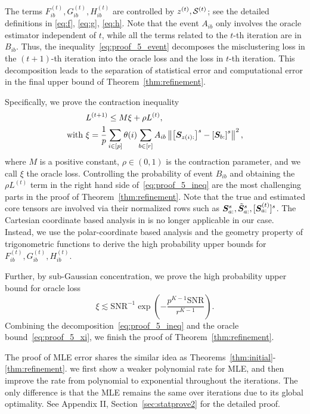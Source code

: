 \documentclass[journal]{IEEEtran}
\theoremstyle{definition}
\theoremstyle{definition}
\newcommand{\of}[1]{\left(#1\right)}
\newcommand{\off}[1]{\left[#1\right]}
\begin{document}
\normalsize
The terms $F_{ib}^{(t)}, G_{ib}^{(t)}, H_{ib}^{(t)}$ are controlled by $z^{(t)}, \mathcal{S}^{(t)}$; see the detailed definitions in \eqref{eq:f}, \eqref{eq:g}, \eqref{eq:h}. Note that the event $A_{ib}$ only involves the oracle estimator independent of $t$, while all the terms related to the $t$-th iteration are in $B_{ib}$. Thus, the inequality~\eqref{eq:proof_5_event} decomposes the misclustering loss in the $(t+1)$-th iteration into the oracle loss and the loss in $t$-th iteration. This decomposition leads to the separation of statistical error and computational error in the final upper bound of Theorem~\ref{thm:refinement}.

Specifically, we prove the contraction inequality
\begin{align}
     &L^{(t+1)} \leq M \xi + \rho L^{(t)}, \\
     \text{with }&\xi = \frac{1}{p}  \sum_{i \in [p]} \theta(i) \sum_{b \in [r]}  A_{ib} \onorm{ \off{ \mS_{ z(i):}  }^s - \off{ \mS_{b:}  }^s  }^2, \label{eq:proof_5_ineq}
\end{align}
where $M$ is a positive constant, $\rho \in (0,1)$ is the contraction parameter, and we call $\xi$ the oracle loss. Controlling the probability of event $B_{ib}$ and obtaining the $\rho L^{(t)}$ term in the right hand side of~\eqref{eq:proof_5_ineq} are the most challenging parts in the proof of Theorem~\ref{thm:refinement}. Note that the true and estimated core tensors are involved via their normalized rows such as $\bm S_{a:}^s, \tilde {\bm S}_{a:}^s, [\bm S^{(t)}_{a:}]^s$. The Cartesian coordinate based analysis in \cite{han2020exact} is no longer applicable in our case. Instead, we use the polar-coordinate based analysis and the geometry property of trigonometric functions to derive the high probability upper bounds for $F_{ib}^{(t)}, G_{ib}^{(t)}, H_{ib}^{(t)}$. 

Further, by sub-Gaussian concentration, we prove the high probability upper bound for oracle loss
\begin{equation}\label{eq:proof_5_xi}
    \xi  \lesssim {\text{SNR}^{-1}}\exp\of{- \frac{p^{K-1}\text{SNR}}{r^{K-1}}}.
\end{equation}
Combining the decomposition~\eqref{eq:proof_5_ineq} and the oracle bound~\eqref{eq:proof_5_xi}, we finish the proof of Theorem~\ref{thm:refinement}.

The proof of MLE error shares the similar idea as Theorems~\ref{thm:initial}-\ref{thm:refinement}. we first show a weaker polynomial rate for MLE, and then improve the rate from polynomial to exponential throughout the iterations. The only difference is that the MLE remains the same over iterations due to its global optimality. See Appendix II, Section~\ref{sec:statprove2} for the detailed proof.
\end{document}
